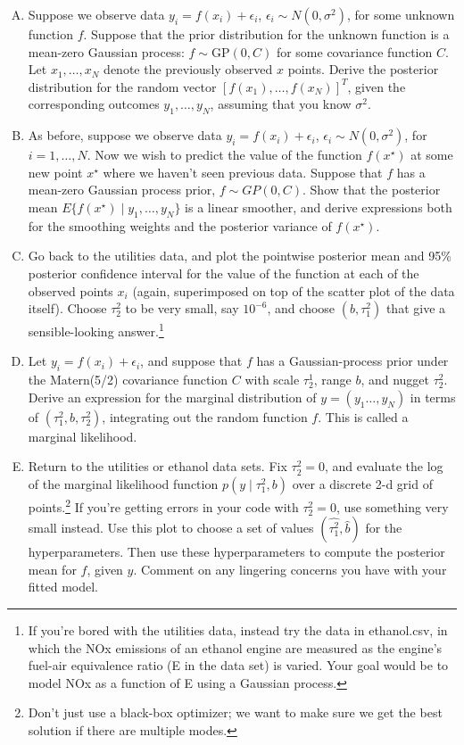 \documentclass[11pt]{article}
\begin{document}
\begin{enumerate}[(A)]

\item Suppose we observe data $y_i = f(x_i) + \epsilon_i$, $\epsilon_i \sim N(0, \sigma^2)$, for some unknown function $f$. Suppose that the prior distribution for the unknown function is a mean-zero Gaussian process: $f \sim \mbox{GP}(0, C)$ for some covariance function $C$.  Let $x_1, \ldots, x_N$ denote the previously observed $x$ points.  Derive the posterior distribution for the random vector $[f(x_1), \ldots, f(x_N)]^T$, given the corresponding outcomes $y_1, \ldots, y_N$, assuming that you know $\sigma^2$.

\item As before, suppose we observe data $y_i = f(x_i) + \epsilon_i$, $\epsilon_i \sim N(0, \sigma^2)$, for $i=1, \ldots, N$.  Now we wish to predict the value of the function $f(x^{\star})$ at some new point $x^{\star}$ where we haven't seen previous data.  Suppose that $f$ has a mean-zero Gaussian process prior, $f \sim GP(0, C)$.  Show that the posterior mean $E\{ f(x^{\star}) \mid y_1, \ldots, y_N \}$ is a linear smoother, and derive expressions both for the smoothing weights and the posterior variance of $f(x^{\star})$.

\item Go back to the utilities data, and plot the pointwise posterior mean and 95\% posterior confidence interval for the value of the function at each of the observed points $x_i$ (again, superimposed on top of the scatter plot of the data itself).  Choose $\tau^2_2$ to be very small, say $10^{-6}$, and choose $(b, \tau^2_1)$ that give a sensible-looking answer.\footnote{If you're bored with the utilities data, instead try the data in ethanol.csv, in which the NOx emissions of an ethanol engine are measured as the engine's fuel-air equivalence ratio (E in the data set) is varied.  Your goal would be to model NOx as a function of E using a Gaussian process. }

\item Let $y_i = f(x_i) + \epsilon_i$, and suppose that $f$ has a Gaussian-process prior under the Matern(5/2) covariance function $C$ with scale $\tau^1_2$, range $b$, and nugget $\tau^2_2$.  Derive an expression for the marginal distribution of $y = (y_1 \ldots, y_N)$ in terms of $(\tau^2_1, b, \tau^2_2)$, integrating out the random function $f$.  This is called a marginal likelihood.

\item Return to the utilities or ethanol data sets. Fix $\tau^2_2 = 0$, and evaluate the log of the marginal likelihood function $p(y \mid \tau^2_1, b)$ over a discrete 2-d grid of points.\footnote{Don't just use a black-box optimizer; we want to make sure we get the best solution if there are multiple modes.} If you're getting errors in your code with $\tau^2_2 = 0$, use something very small instead.  Use this plot to choose a set of values $(\hat{\tau^2_1}, \hat{b})$ for the hyperparameters.  Then use these hyperparameters to compute the posterior mean for $f$, given $y$.  Comment on any lingering concerns you have with your fitted model.


\end{enumerate}
\end{document}
